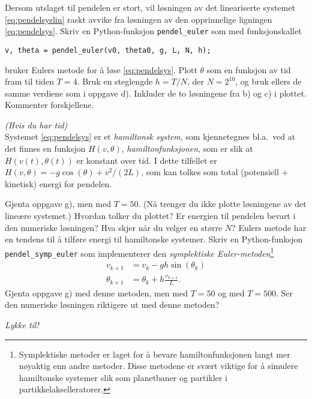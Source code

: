 \documentclass[11pt,norsk,a4paper]{article}
\begin{document}
\begin{oppgaver}
\begin{deloppgaver}
\oppgave
Dersom utslaget til pendelen er stort, vil løsningen av det lineariserte systemet \eqref{eq:pendelsyslin} raskt avvike fra løsningen av den opprinnelige ligningen \eqref{eq:pendelsys}. Skriv en Python-funksjon \verb|pendel_euler| som med funksjonskallet 
\begin{verbatim}
v, theta = pendel_euler(v0, theta0, g, L, N, h);
\end{verbatim}
bruker Eulers metode for å løse \eqref{eq:pendelsys}. Plott $\theta$ som en funksjon av tid fram til tiden $T=4$. Bruk en steglengde $h=T/N$, der $N=2^{10}$, og bruk ellers de samme verdiene som i oppgave d). Inkluder de to løsningene fra b) og c) i plottet. Kommenter forskjellene.

\oppgave
\emph{(Hvis du har tid)} \\
Systemet \eqref{eq:pendelsys} er et \emph{hamiltonsk system}, som kjennetegnes bl.a.~ved at det finnes en funksjon $H(v,\theta)$, \emph{hamiltonfunksjonen}, som er slik at $H(v(t),\theta(t))$ er konstant over tid. I dette tilfellet er $H(v,\theta)=-g\cos(\theta)+v^2/(2L)$, som kan tolkes som total (potensiell + kinetisk) energi for pendelen.
\begin{enumerate}
\oppgave Gjenta oppgave g), men med $T=50$. (Nå trenger du ikke plotte løsningene av det lineære systemet.) Hvordan tolker du plottet? Er energien til pendelen bevart i den numeriske løsningen? Hva skjer når du velger en større $N$?
\oppgave Eulers metode har en tendens til å tilføre energi til hamiltonske systemer. Skriv en Python-funksjon \verb|pendel_symp_euler| som implementerer den \emph{symplektiske Euler-metoden}\footnote{Symplektiske metoder er laget for å bevare hamiltonfunksjonen langt mer nøyaktig enn andre metoder. Disse metodene er svært viktige for å simulere hamiltonske systemer slik som planetbaner og partikler i partikkelakselleratorer.}
\begin{equation}\label{eq:sympeulerpendellin}
\begin{split}
v_{k+1} &= v_k - gh\sin(\theta_k) \\
\theta_{k+1} &= \theta_k + h\frac{v_{k+1}}{L}.
\end{split}
\end{equation}
Gjenta oppgave g) med denne metoden, men med $T=50$ og med $T=500$. Ser den numeriske løsningen riktigere ut med denne metoden?
\end{enumerate}
\end{deloppgaver}





\vspace{1cm}
\centerline{\em Lykke til!}

\end{oppgaver}
\end{document}
